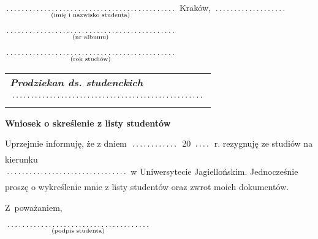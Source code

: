 \documentclass[a4paper,8pt]{article}
\newcommand{\fillField}[2]{
    $\underset{\text{#1}}{\parbox[t]{#2}{\dotfill}}$
}
\begin{document}
\noindent
\fillField{(imię i nazwisko studenta)}{7cm} \hfill Kraków, \fillField{}{3cm} \\\\
\fillField{(nr albumu)}{7cm} \\\\
\fillField{(rok studiów)}{7cm} \\


\phantom{a}\hfill
\begin{tabular}[c]{@{}l@{}}
\textit{\textbf{Prodziekan ds. studenckich}} \\\\
\fillField{}{8cm}
\end{tabular}

\vskip 2.0cm

\begin{center}
{\Large \textbf{Wniosek o skreślenie z listy studentów}}
\end{center}

\vskip 0.5cm

Uprzejmie informuję, że z dniem \fillField{}{2cm} 20\fillField{}{0.7cm} r.
rezygnuję ze studiów na kierunku \hfill\\
\fillField{}{5cm} w Uniwersytecie Jagiellońskim. Jednocześnie proszę o
wykreślenie mnie z listy studentów oraz zwrot moich dokumentów.

\vskip 2.0cm

\hspace{\fill} Z~poważaniem, \hspace{2.8cm} \\\\
\null\hfill\fillField{(podpis studenta)}{6cm}%
\vskip 4.0cm
\end{document}
